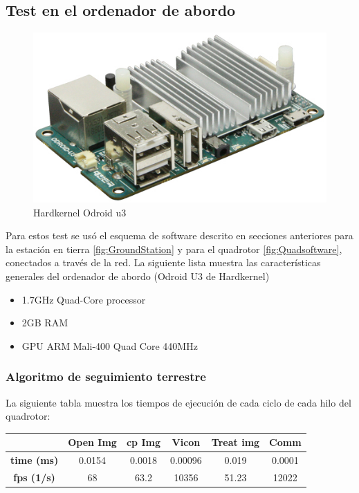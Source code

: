 	\newpage
	
\subsection{Test en el ordenador de abordo}
	\label{test_with_odroid_and_GT}
	
	\begin{figure}
		\includegraphics[width=\linewidth]{../Images/c4/odroidu3}
		\caption{Hardkernel Odroid u3}
		\label{fig:odroidu3}
	\end{figure}
		
	Para estos test se us\'o el esquema de software descrito en secciones anteriores para la estaci\'on en tierra \ref{fig:GroundStation} y para el quadrotor \ref{fig:Quadsoftware}, conectados a trav\'es de la red. La siguiente lista muestra las caracter\'isticas generales del ordenador de abordo (Odroid U3 de Hardkernel)
	
	\begin{itemize}
		\item 1.7GHz Quad-Core processor 
		\item 2GB RAM
		\item GPU ARM Mali-400 Quad Core 440MHz  
	\end{itemize}
	
	\subsubsection{Algoritmo de seguimiento terrestre}
	
	La siguiente tabla muestra los tiempos de ejecuci\'on de cada ciclo de cada hilo del quadrotor:
	\newline
	\newline
	{
	\centering
		\begin{tabular}{|c|c|c|c|c|c|}
		\hline  					&  Open Img	&  cp Img 	& Vicon 	& Treat img & Comm  		\\ 
		\hline  \textbf{time (ms)}	& 	0.0154	& 0.0018	&	0.00096	&  	 0.019	&	0.0001		\\ 
		\hline  \textbf{fps (1/s)}	&  	68		&  63.2		&  10356	&  	51.23	&	12022		\\ 
		\hline 
		\end{tabular} 
	}
	\newline
	
